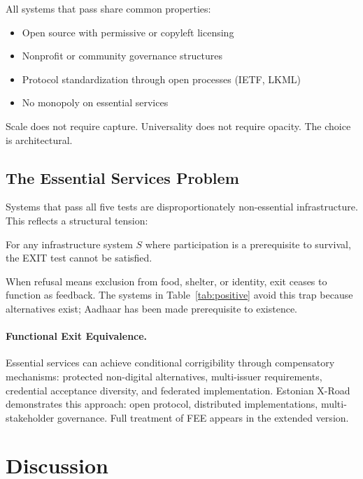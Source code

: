 All systems that pass share common properties:
\begin{itemize}
    \item Open source with permissive or copyleft licensing
    \item Nonprofit or community governance structures
    \item Protocol standardization through open processes (IETF, LKML)
    \item No monopoly on essential services
\end{itemize}

Scale does not require capture. Universality does not require opacity. The choice is architectural.

\subsection{The Essential Services Problem}
\label{subsec:essential}

Systems that pass all five tests are disproportionately non-essential infrastructure. This reflects a structural tension:

\begin{proposition}
\label{prop:essentiality}
For any infrastructure system $S$ where participation is a prerequisite to survival, the EXIT test cannot be satisfied.
\end{proposition}

When refusal means exclusion from food, shelter, or identity, exit ceases to function as feedback. The systems in Table~\ref{tab:positive} avoid this trap because alternatives exist; Aadhaar has been made prerequisite to existence.

\paragraph{Functional Exit Equivalence.} Essential services can achieve conditional corrigibility through compensatory mechanisms: protected non-digital alternatives, multi-issuer requirements, credential acceptance diversity, and federated implementation. Estonian X-Road demonstrates this approach: open protocol, distributed implementations, multi-stakeholder governance. Full treatment of FEE appears in the extended version.

\section{Discussion}
\label{sec:discussion}

